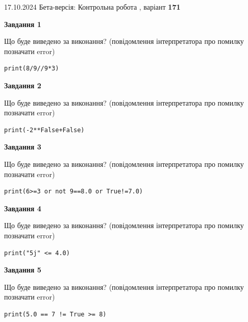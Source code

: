 \documentclass[12pt, ukrainian]{article}
\begin{document}
{\Large{17.10.2024 Бета-версія: Контрольна робота , варіант  \No \textbf { 171 }\par}}
{
\begin {large}
{\begin {center}\textbf{Завдання 1}\end {center}}

Що буде виведено за виконання? (повідомлення інтерпретатора про помилку позначати error)\par
\begin{verbatim}
print(8/9//9*3)
\end{verbatim}

{\begin {center}\textbf{Завдання 2}\end {center}}

Що буде виведено за виконання? (повідомлення інтерпретатора про помилку позначати error)\par
\begin{verbatim}
print(-2**False+False)
\end{verbatim}

{\begin {center}\textbf{Завдання 3}\end {center}}

Що буде виведено за виконання? (повідомлення інтерпретатора про помилку позначати error)\par
\begin{verbatim}
print(6>=3 or not 9==8.0 or True!=7.0)
\end{verbatim}

{\begin {center}\textbf{Завдання 4}\end {center}}

Що буде виведено за виконання? (повідомлення інтерпретатора про помилку позначати error)\par
\begin{verbatim}
print("5j" <= 4.0)
\end{verbatim}

{\begin {center}\textbf{Завдання 5}\end {center}}

Що буде виведено за виконання? (повідомлення інтерпретатора про помилку позначати error)\par
\begin{verbatim}
print(5.0 == 7 != True >= 8)
\end{verbatim}


\end{large}}
\end{document}
